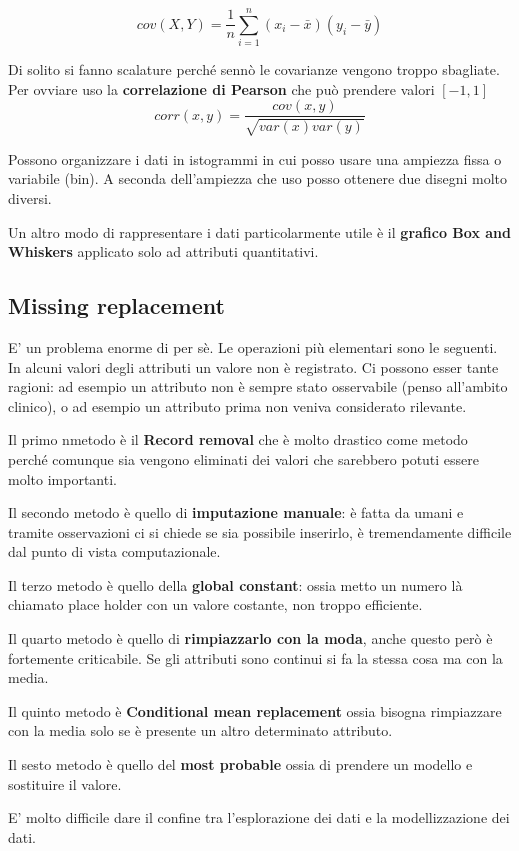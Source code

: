 \documentclass[12pt, a4paper,titlepage,openany]{article}
\begin{document}
\[cov(X,Y) = \frac{1}{n}\sum_{i = 1}^{n} (x_{i} - \bar{x})(y_{i} - \bar{y})\]

Di solito si fanno scalature perché sennò le covarianze vengono troppo sbagliate. Per ovviare uso la \textbf{correlazione di Pearson} che può prendere valori $[-1,1]$
\[ corr(x,y) = \frac{cov(x,y)}{\sqrt{var(x)var(y)}}\]

Possono organizzare i dati in istogrammi in cui posso usare una ampiezza fissa o variabile (bin). A seconda dell'ampiezza che uso posso ottenere due disegni molto diversi.

Un altro modo di rappresentare i dati particolarmente utile è il \textbf{grafico Box and Whiskers} applicato solo ad attributi quantitativi.

\subsection{Missing replacement}

E' un problema enorme di per sè. Le operazioni più elementari sono le seguenti. In alcuni valori degli attributi un valore non è registrato. Ci possono esser tante ragioni: ad esempio un attributo non è sempre stato osservabile (penso all'ambito clinico), o ad esempio un attributo prima non veniva considerato rilevante.

Il primo nmetodo è il \textbf{Record removal} che è molto drastico come metodo perché comunque sia vengono eliminati dei valori che sarebbero potuti essere molto importanti.

Il secondo metodo è quello di \textbf{imputazione manuale}: è fatta da umani e tramite osservazioni ci si chiede se sia possibile inserirlo, è tremendamente difficile dal punto di vista computazionale.

Il terzo metodo è quello della \textbf{global constant}: ossia metto un numero là chiamato place holder con un valore costante, non troppo efficiente.

Il quarto metodo è quello di \textbf{rimpiazzarlo con la moda}, anche questo però è fortemente criticabile.
Se gli attributi sono continui si fa la stessa cosa ma con la media.

Il quinto metodo è \textbf{Conditional mean replacement} ossia bisogna rimpiazzare con la media solo se è presente un altro determinato attributo.

Il sesto metodo è quello del \textbf{most probable} ossia di prendere un modello e sostituire il valore.

E' molto difficile dare il confine tra l'esplorazione dei dati e la modellizzazione dei dati.
\end{document}
